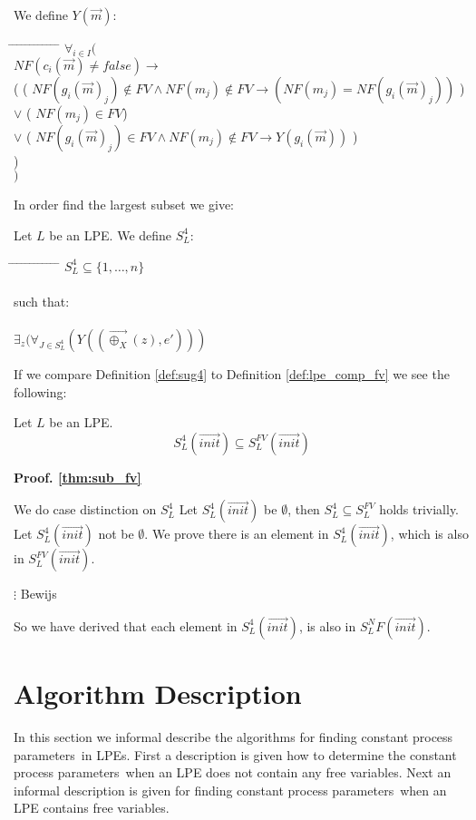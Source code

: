 \index{}\documentclass[a4paper,10pt]{article}
\theoremstyle{plain}
\theoremstyle{definition}
\newcommand{\ovr}{\overrightarrow}
\newcommand{\pps}{process parameters}
\newcommand{\tb}{\textbf}
\newcommand{\tab}{\hspace*{5.mm} \= \hspace*{5.mm} \= \hspace*{5.mm} \= \hspace*{5.mm} \= \hspace*{5.mm} \= \hspace*{5.mm}  \= \hspace*{5.mm}  \= \hspace*{5.mm}  \= \hspace*{5.mm} \= \hspace*{5.mm} \= \hspace*{5.mm}  \= \hspace*{5.mm}  \= \hspace*{5.mm}\kill}
\begin{document}
\begin{defn} We define $Y(\ovr{m})$:
\begin{tabbing}
\tab
$\forall_{i \in I}($\\
\> $NF(c_i(\ovr{m}) \neq false) \rightarrow$ \\
\> ( \> 		\> ( $NF(g_i(\ovr{m})_j) \not\in FV \wedge NF(m_j) \not\in FV \rightarrow (NF(m_j) = NF(g_i(\ovr{m})_j))$ )\\
\> \> $\vee$ 	\> ( $NF( m_j) \in FV $)\\
\> \> $\vee$ 	\>	( $NF(g_i(\ovr{m})_j) \in FV \wedge NF(m_j) \not\in FV \rightarrow Y(g_i(\ovr{m}))$ )\\
\> ) \\
$)$
\end{tabbing}
\end{defn}

\noindent In order find the largest subset we give: %
\begin{defn} \label{def:sug4} Let $L$ be an LPE. We define $S_L^4$:
\begin{tabbing}
\tab
$ S_L^4 \subseteq \lbrace 1, \ldots, n \rbrace $ \\ \\
such that:\\ \\
$\exists_{z}( \forall_{J \in S_L^4} (Y((\ovr{\oplus_X}(z), e')))$ \\
\end{tabbing}
\end{defn}
If we compare Definition \ref{def:sug4} to Definition \ref{def:lpe_comp_fv} we see the following:
\begin{thm} Let $L$ be an LPE. \label{thm:sub_fv}
$$S_L^4(\ovr{init}) \subseteq S_L^{FV}(\ovr{init}) $$
\end{thm} 
\begin{flushleft}
\tb{Proof. \ref{thm:sub_fv}}
\end{flushleft}
We do case distinction on $S_L^4$
Let $S_L^4(\ovr{init})$ be $\emptyset$, then $S_L^4 \subseteq S_L^{FV}$ holds trivially.
Let $S_L^4(\ovr{init})$ not be $\emptyset$. We prove there is an element in $S_L^4(\ovr{init})$, which is also in $S_L^{FV}(\ovr{init})$.
\begin{tabbing}
$\vdots$ Bewijs
\end{tabbing}

So we have derived that each element in $S_L^4(\ovr{init})$, is also in $S_L^NF(\ovr{init})$.


\section{Algorithm Description}
In this section we informal describe the algorithms for finding constant \pps\ in LPEs. First a description is given how to determine the constant \pps\ when an LPE does not contain any free variables. Next an informal description is given for finding constant \pps\ when an LPE contains free variables.
\end{document}
